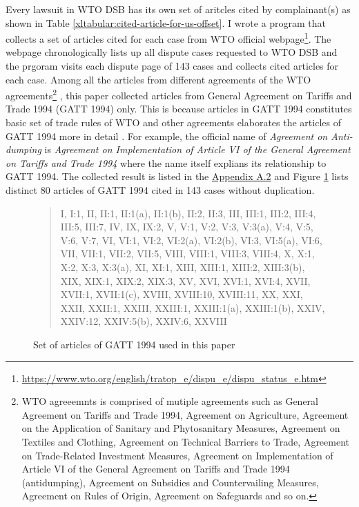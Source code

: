 Every lawsuit in WTO DSB 
has its own set of aritcles cited by complainant(s)
as shown in Table 
\ref{xltabular:cited-article-for-us-offset}. 
I wrote a program that collects a set of articles cited for 
each case from WTO official webpage\footnote{\url{https://www.wto.org/english/tratop_e/dispu_e/dispu_status_e.htm}}. 
The webpage chronologically lists up all dispute cases
requested to WTO DSB and the prgoram visits each dispute page of 143 cases
and collects cited articles for each case. Among all the articles from different agreements
of the WTO agreements\footnote{
    WTO agreeemnts is comprised of mutiple agreements such as
    General Agreement on Tariffs and Trade 1994,
    Agreement on Agriculture,
    Agreement on the Application of Sanitary and Phytosanitary Measures,
    Agreement on Textiles and Clothing,
    Agreement on Technical Barriers to Trade,
    Agreement on Trade-Related Investment Measures,
    Agreement on Implementation of Article VI of the General Agreement on Tariffs and Trade 1994 (antidumping),
    Agreement on Subsidies and Countervailing Measures,
    Agreement on Rules of Origin,
    Agreement on Safeguards and so on.
    } ,
this paper collected articles from General Agreement on Tariffs and Trade 1994 (GATT 1994) only. 
This is because articles in GATT 1994 constitutes basic set of trade rules of WTO and other agreements 
elaborates the articles of GATT 1994 more in detail \citep{world1999wto}. For example, the official name of \textit{Agreement on Anti-dumping}
is \textit{Agreement on Implementation of Article VI of the General Agreement on Tariffs and Trade 1994}
where the name itself explians its relationship to GATT 1994.
The collected result is listed in the \hyperref[sub:cited-articles-table]{Appendix A.2} and Figure \ref{fig:set-of-articles-used} 
lists distinct 80 articles of GATT 1994 cited in 143 cases without duplication. 

\begin{figure}[h]
    \begin{quote}
    I, 
    I:1, 
    II, 
    II:1, 
    II:1(a), 
    II:1(b), 
    II:2, 
    II:3, 
    III, 
    III:1, 
    III:2, 
    III:4, 
    III:5, 
    III:7, 
    IV, 
    IX, 
    IX:2, 
    V, 
    V:1, 
    V:2, 
    V:3, 
    V:3(a), 
    V:4, 
    V:5, 
    V:6, 
    V:7, 
    VI, 
    VI:1, 
    VI:2, 
    VI:2(a), 
    VI:2(b), 
    VI:3, 
    VI:5(a), 
    VI:6, 
    VII, 
    VII:1, 
    VII:2, 
    VII:5, 
    VIII, 
    VIII:1, 
    VIII:3, 
    VIII:4, 
    X, 
    X:1, 
    X:2, 
    X:3, 
    X:3(a), 
    XI, 
    XI:1, 
    XIII, 
    XIII:1, 
    XIII:2, 
    XIII:3(b), 
    XIX, 
    XIX:1, 
    XIX:2, 
    XIX:3, 
    XV, 
    XVI, 
    XVI:1, 
    XVI:4, 
    XVII, 
    XVII:1, 
    XVII:1(c), 
    XVIII, 
    XVIII:10, 
    XVIII:11, 
    XX, 
    XXI, 
    XXII, 
    XXII:1, 
    XXIII, 
    XXIII:1, 
    XXIII:1(a), 
    XXIII:1(b), 
    XXIV, 
    XXIV:12, 
    XXIV:5(b), 
    XXIV:6, 
    XXVIII
    \end{quote}
    \caption{Set of articles of GATT 1994 used in this paper}
    \label{fig:set-of-articles-used}
\end{figure}

